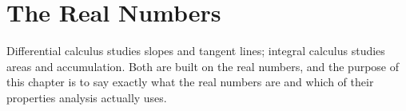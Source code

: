 \section{The Real Numbers}

Differential calculus studies slopes and tangent lines; integral calculus
studies areas and accumulation. Both are built on the real numbers, and the
purpose of this chapter is to say exactly what the real numbers are and
which of their properties analysis actually uses.






